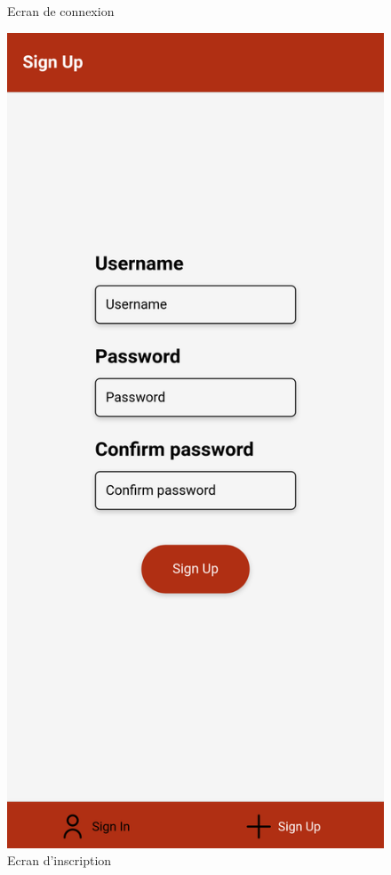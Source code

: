 \documentclass[12pt]{article}
\begin{document}
\begin{minipage}[t]{0.45\textwidth}
\begin{figure}[H]
                \caption{Ecran de connexion}
                \label{fig:connexion}
            \end{figure}
        \end{minipage}
        \hspace{0.5cm}
        \begin{minipage}[t]{0.45\textwidth}
            \begin{figure}[H]
                \centering
                \includegraphics[scale=0.2]{images/signUp}
                \caption{Ecran d'inscription}
                \label{fig:inscription}
            \end{figure}
        \end{minipage}
        \\
\end{document}
